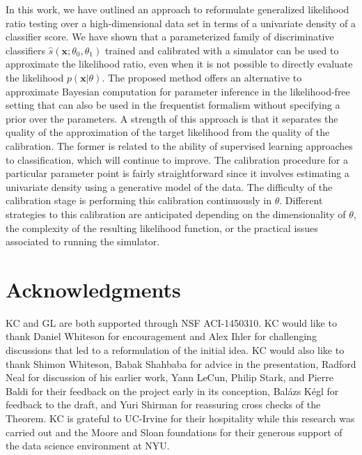 \documentclass[12pt]{article}
\numberwithin{equation}{section}
\theoremstyle{plain}
\begin{document}
In this work, we have outlined an approach to reformulate generalized likelihood
ratio testing over a high-dimensional data set in terms of a univariate density
of a classifier score. We have shown that a parameterized family of
discriminative classifiers $\hat s(\mathbf{x}; \theta_0, \theta_1)$ trained and
calibrated with a simulator can be used to approximate the likelihood ratio,
even when it is not possible to directly evaluate the likelihood
$p(\mathbf{x}|\theta)$.
The proposed method offers an alternative to approximate Bayesian computation
for parameter inference in the likelihood-free setting that can also be used in
the frequentist formalism without specifying a prior over the parameters. A
strength of this approach is that it separates the quality of the approximation
of the target likelihood from the quality of the calibration. The former is
related to the ability of supervised learning approaches to  classification,
which will continue to improve. The calibration procedure for a particular
parameter point is fairly straightforward since it involves estimating a
univariate density using a generative model of the data. The difficulty of the
calibration stage is performing this calibration continuously in $\theta$.
Different strategies to this calibration are anticipated depending on the
dimensionality of $\theta$, the complexity of the resulting likelihood function,
or the practical issues associated to running the simulator.

\section*{Acknowledgments} KC and GL are both supported through NSF ACI-1450310.
KC would like to thank Daniel Whiteson for
encouragement and Alex Ihler for challenging discussions
that  led to a reformulation of the initial idea. KC would also like to thank
Shimon Whiteson, Babak Shahbaba for advice in the presentation, Radford Neal for
discussion of his earlier work, Yann LeCun, Philip Stark, and Pierre Baldi for
their feedback on the project early in its conception, Bal\'azs K\'egl for
feedback to the draft,  and Yuri
Shirman for reassuring cross checks of the Theorem.   KC is grateful
to UC-Irvine for their hospitality while this research was carried out and the
Moore and Sloan foundations for their generous support of the data science
environment at NYU.
\end{document}
